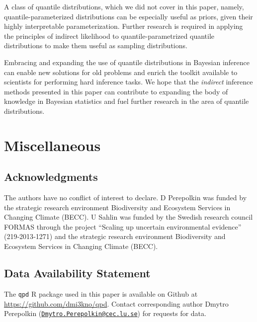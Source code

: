 \documentclass[
  12pt,
]{article}
\begin{document}
A class of quantile distributions, which we did not cover in this paper, namely, quantile-parameterized distributions \citep{keelin2011QuantileParameterizedDistributions, hadlock2017JohnsonQuantileParameterizedDistributions, keelin2016MetalogDistributions} can be especially useful as priors, given their highly interpretable parameterization. Further research is required in applying the principles of indirect likelihood to quantile-parametrized quantile distributions to make them useful as sampling distributions.

Embracing and expanding the use of quantile distributions in Bayesian inference can enable new solutions for old problems and enrich the toolkit available to scientists for performing hard inference tasks. We hope that the \emph{indirect} inference methods presented in this paper can contribute to expanding the body of knowledge in Bayesian statistics and fuel further research in the area of quantile distributions.

\hypertarget{miscellaneous}{%
\section*{Miscellaneous}\label{miscellaneous}}

\hypertarget{acknowledgments}{%
\subsection*{Acknowledgments}\label{acknowledgments}}

The authors have no conﬂict of interest to declare. D Perepolkin was funded by the strategic research environment Biodiversity and Ecosystem
Services in Changing Climate (BECC). U Sahlin was funded by the Swedish research council FORMAS through the project ``Scaling up
uncertain environmental evidence'' (219‐2013‐1271) and the strategic research environment Biodiversity and Ecosystem
Services in Changing Climate (BECC).

\hypertarget{data-availability-statement}{%
\subsection*{Data Availability Statement}\label{data-availability-statement}}

The \texttt{qpd} R package used in this paper is available on Github at \url{https://github.com/dmi3kno/qpd}. Contact corresponding author Dmytro Perepolkin (\href{mailto:Dmytro.Perepolkin@cec.lu.se}{\nolinkurl{Dmytro.Perepolkin@cec.lu.se}}) for requests for data.
\end{document}
